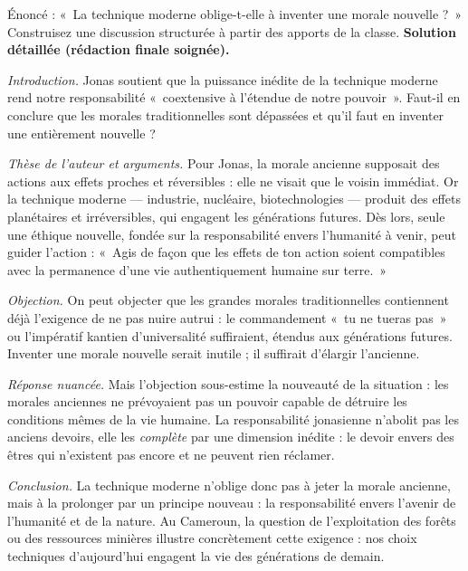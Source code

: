 \documentclass[11pt]{article}
\begin{document}
\begin{exoresolu}
Énoncé : «~La technique moderne oblige-t-elle à inventer une morale nouvelle ?~» Construisez une discussion structurée à partir des apports de la classe.
\tcblower
\textbf{Solution détaillée (rédaction finale soignée).}
\par\medskip
\emph{Introduction.} Jonas soutient que la puissance inédite de la technique moderne rend notre responsabilité «~coextensive à l'étendue de notre pouvoir~». Faut-il en conclure que les morales traditionnelles sont dépassées et qu'il faut en inventer une entièrement nouvelle ?
\par
\emph{Thèse de l'auteur et arguments.} Pour Jonas, la morale ancienne supposait des actions aux effets proches et réversibles : elle ne visait que le voisin immédiat. Or la technique moderne — industrie, nucléaire, biotechnologies — produit des effets planétaires et irréversibles, qui engagent les générations futures. Dès lors, seule une éthique nouvelle, fondée sur la responsabilité envers l'humanité à venir, peut guider l'action : «~Agis de façon que les effets de ton action soient compatibles avec la permanence d'une vie authentiquement humaine sur terre.~»
\par
\emph{Objection.} On peut objecter que les grandes morales traditionnelles contiennent déjà l'exigence de ne pas nuire autrui : le commandement «~tu ne tueras pas~» ou l'impératif kantien d'universalité suffiraient, étendus aux générations futures. Inventer une morale nouvelle serait inutile ; il suffirait d'élargir l'ancienne.
\par
\emph{Réponse nuancée.} Mais l'objection sous-estime la nouveauté de la situation : les morales anciennes ne prévoyaient pas un pouvoir capable de détruire les conditions mêmes de la vie humaine. La responsabilité jonasienne n'abolit pas les anciens devoirs, elle les \emph{complète} par une dimension inédite : le devoir envers des êtres qui n'existent pas encore et ne peuvent rien réclamer.
\par
\emph{Conclusion.} La technique moderne n'oblige donc pas à jeter la morale ancienne, mais à la prolonger par un principe nouveau : la responsabilité envers l'avenir de l'humanité et de la nature. Au Cameroun, la question de l'exploitation des forêts ou des ressources minières illustre concrètement cette exigence : nos choix techniques d'aujourd'hui engagent la vie des générations de demain.
\end{exoresolu}
\end{document}
